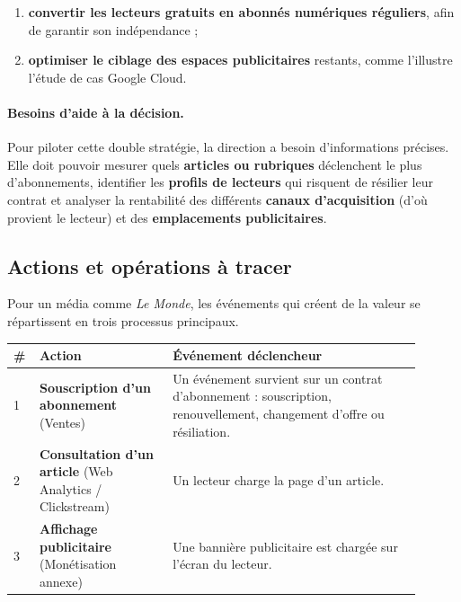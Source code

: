 \documentclass[a4paper,12pt]{article}
\begin{document}
\begin{enumerate}
  \item \textbf{convertir les lecteurs gratuits en abonnés numériques réguliers},
        afin de garantir son indépendance ;
  \item \textbf{optimiser le ciblage des espaces publicitaires} restants,
        comme l'illustre l'étude de cas Google Cloud.
\end{enumerate}

\paragraph{Besoins d'aide à la décision.}
Pour piloter cette double stratégie, la direction a besoin d'informations
précises. Elle doit pouvoir mesurer quels \textbf{articles ou rubriques} déclenchent le plus d'abonnements, identifier les \textbf{profils de lecteurs} qui risquent de résilier leur contrat et analyser la rentabilité des différents \textbf{canaux d'acquisition} (d'où provient le lecteur) et des \textbf{emplacements publicitaires}.

\subsection{Actions et opérations à tracer}

Pour un média comme \emph{Le Monde}, les événements qui créent de la valeur
se répartissent en trois processus principaux.

\begin{center}
\renewcommand{\arraystretch}{1.3}
\begin{tabular}{@{}p{0.04\linewidth}p{0.30\linewidth}p{0.56\linewidth}@{}}
  \toprule
  \textbf{\#} & \textbf{Action} & \textbf{Événement déclencheur} \\
  \midrule
  1 & \textbf{Souscription d'un abonnement} \newline
      {\footnotesize (Ventes)}
    & Un événement survient sur un contrat d'abonnement : souscription,
      renouvellement, changement d'offre ou résiliation. \\
  2 & \textbf{Consultation d'un article} \newline
      {\footnotesize (Web Analytics / Clickstream)}
    & Un lecteur charge la page d'un article. \\
  3 & \textbf{Affichage publicitaire} \newline
      {\footnotesize (Monétisation annexe)}
    & Une bannière publicitaire est chargée sur l'écran du lecteur. \\
  \bottomrule
\end{tabular}
\end{center}
\end{document}
